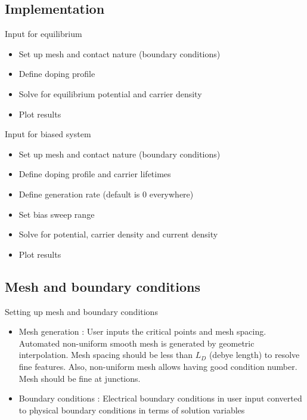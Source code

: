 \documentclass{beamer}
\begin{document}
\subsection{Implementation}
\begin{frame}{Input for equilibrium}
\begin{itemize}
	\item Set up mesh and contact nature (boundary conditions)
	\item Define doping profile
	\item Solve for equilibrium potential and carrier density
	\item Plot results	
\end{itemize}
\end{frame}

\begin{frame}{Input for biased system}
\begin{itemize}
	\item Set up mesh and contact nature (boundary conditions)
	\item Define doping profile and carrier lifetimes
	\item Define generation rate (default is 0 everywhere)
	\item Set bias sweep range
	\item Solve for potential, carrier density and current density
	\item Plot results
\end{itemize}
\end{frame}

\subsection{Mesh and boundary conditions}

\begin{frame}{Setting up mesh and boundary conditions}
\begin{itemize}
  \item Mesh generation : User inputs the critical points and mesh spacing. Automated non-uniform smooth mesh is generated by geometric interpolation. Mesh spacing should be less than $L_D$ (debye length) to resolve fine features. Also, non-uniform mesh allows having good condition number. Mesh should be fine at junctions.
  \item Boundary conditions : Electrical boundary conditions in user input converted to physical boundary conditions in terms of solution variables
\end{itemize}
\end{frame}
\end{document}
